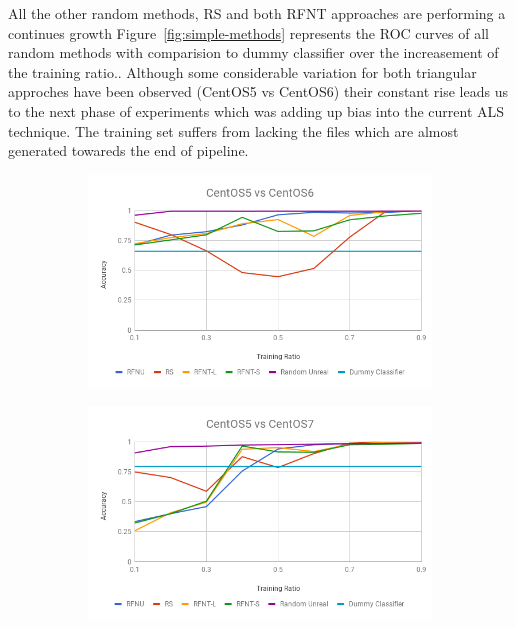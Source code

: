 \documentclass[10pt, conference, compsocconf]{IEEEtran}
\begin{document}
All the other random methods, RS and both RFNT approaches 
are performing a continues growth Figure~\ref{fig:simple-methods} represents
the ROC curves of all random methods with comparision to dummy
classifier over the increasement of the training ratio.. Although some considerable variation 
for both triangular approches have been observed (CentOS5 vs CentOS6) 
their constant rise leads us to the next phase of experiments which was 
adding up bias into the current ALS technique. 
The training set suffers from lacking the files which are almost generated towareds the end of pipeline.

\begin{figure}[h!]
        \centering
        \begin{subfigure}[b]{0.4\linewidth}
                \includegraphics[width=\columnwidth]{figures/simple-methods-5vs6}
        \end{subfigure}
        \begin{subfigure}[b]{0.4\linewidth}
		\includegraphics[width=\columnwidth]{figures/simple-methods-5vs7}

\end{subfigure}
\end{figure}
\end{document}
